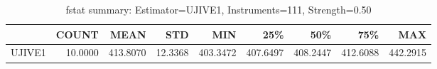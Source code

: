 \begin{table}[ht]
\centering
\caption{fstat summary: Estimator=UJIVE1, Instruments=111, Strength=0.50}
\begin{tabular}{lrrrrrrrr}
\toprule
 & COUNT & MEAN & STD & MIN & 25\% & 50\% & 75\% & MAX \\
\midrule
UJIVE1 & 10.0000 & 413.8070 & 12.3368 & 403.3472 & 407.6497 & 408.2447 & 412.6088 & 442.2915 \\
\bottomrule
\end{tabular}
\end{table}
